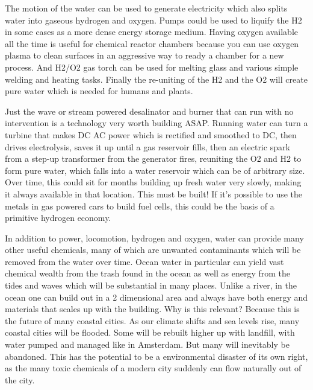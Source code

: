 The motion of the water can be used to generate electricity which also
splits water into gaseous hydrogen and oxygen. Pumps could be used to
liquify the H2 in some cases as a more dense energy storage medium.
Having oxygen available all the time is useful for chemical reactor
chambers because you can use oxygen plasma to clean surfaces in an
aggressive way to ready a chamber for a new process. And H2/O2 gas torch
can be used for melting glass and various simple welding and heating
tasks. Finally the re-uniting of the H2 and the O2 will create pure
water which is needed for humans and plants.

Just the wave or stream powered desalinator and burner that can run with
no intervention is a technology very worth building ASAP. Running water
can turn a turbine that makes DC AC power which is rectified and
smoothed to DC, then drives electrolysis, saves it up until a gas
reservoir fills, then an electric spark from a step-up transformer from
the generator fires, reuniting the O2 and H2 to form pure water, which
falls into a water reservoir which can be of arbitrary size. Over time,
this could sit for months building up fresh water very slowly, making it
always available in that location. This must be built! If it's possible
to use the metals in gas powered cars to build fuel cells, this could be
the basis of a primitive hydrogen economy.

In addition to power, locomotion, hydrogen and oxygen, water can provide
many other useful chemicals, many of which are unwanted contaminants
which will be removed from the water over time. Ocean water in
particular can yield vast chemical wealth from the trash found in the
ocean as well as energy from the tides and waves which will be
substantial in many places. Unlike a river, in the ocean one can build
out in a 2 dimensional area and always have both energy and materials
that scales up with the building. Why is this relevant? Because this is
the future of many coastal cities. As our climate shifts and sea levels
rise, many coastal cities will be flooded. Some will be rebuilt higher
up with landfill, with water pumped and managed like in Amsterdam. But
many will inevitably be abandoned. This has the potential to be a
environmental disaster of its own right, as the many toxic chemicals of
a modern city suddenly can flow naturally out of the city.

